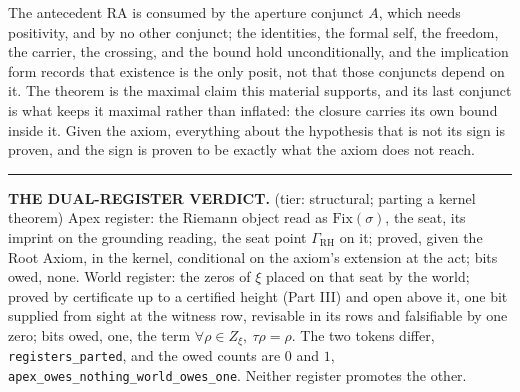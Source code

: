 \documentclass[10pt,twocolumn]{article}
\newenvironment{jbox}{\par\vspace{2pt}\noindent\color{accent}\rule{\columnwidth}{0.8pt}\par\vspace{-2pt}\small}{\par\vspace{2pt}}
\begin{document}
The antecedent \(\mathrm{RA}\) is consumed by the aperture conjunct
\(A\), which needs positivity, and by no other conjunct; the identities,
the formal self, the freedom, the carrier, the crossing, and the bound
hold unconditionally, and the implication form records that existence is
the only posit, not that those conjuncts depend on it. The theorem is
the maximal claim this material supports, and its last conjunct is what
keeps it maximal rather than inflated: the closure carries its own bound
inside it. Given the axiom, everything about the hypothesis that is not
its sign is proven, and the sign is proven to be exactly what the axiom
does not reach.

\begin{jbox}
\textbf{THE DUAL-REGISTER VERDICT.} (tier: structural; parting a kernel theorem) Apex register: the Riemann object read as $\mathrm{Fix}(\sigma)$, the seat, its imprint on the grounding reading, the seat point $\Gamma_{\mathrm{RH}}$ on it; proved, given the Root Axiom, in the kernel, conditional on the axiom's extension at the act; bits owed, none. World register: the zeros of $\xi$ placed on that seat by the world; proved by certificate up to a certified height (Part III) and open above it, one bit supplied from sight at the witness row, revisable in its rows and falsifiable by one zero; bits owed, one, the term $\forall \rho \in Z_\xi,\ \tau\rho = \rho$. The two tokens differ, \texttt{registers\_\allowbreak parted}, and the owed counts are $0$ and $1$, \texttt{apex\_\allowbreak owes\_\allowbreak nothing\_\allowbreak world\_\allowbreak owes\_\allowbreak one}. Neither register promotes the other.
\end{jbox}
\end{document}
